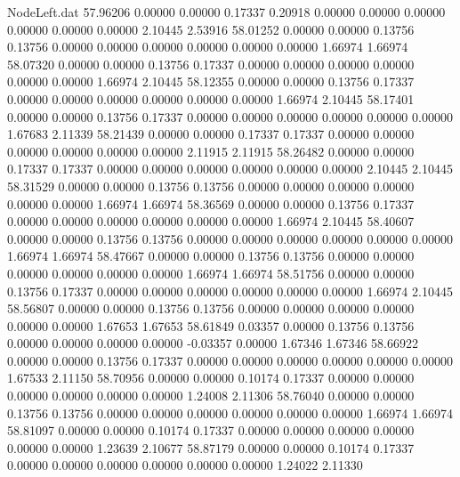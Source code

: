 \begin{filecontents}{NodeLeft.dat}
  57.96206    0.00000    0.00000     0.17337    0.20918    0.00000    0.00000    0.00000    0.00000    0.00000    0.00000    2.10445    2.53916
  58.01252    0.00000    0.00000     0.13756    0.13756    0.00000    0.00000    0.00000    0.00000    0.00000    0.00000    1.66974    1.66974
  58.07320    0.00000    0.00000     0.13756    0.17337    0.00000    0.00000    0.00000    0.00000    0.00000    0.00000    1.66974    2.10445
  58.12355    0.00000    0.00000     0.13756    0.17337    0.00000    0.00000    0.00000    0.00000    0.00000    0.00000    1.66974    2.10445
  58.17401    0.00000    0.00000     0.13756    0.17337    0.00000    0.00000    0.00000    0.00000    0.00000    0.00000    1.67683    2.11339
  58.21439    0.00000    0.00000     0.17337    0.17337    0.00000    0.00000    0.00000    0.00000    0.00000    0.00000    2.11915    2.11915
  58.26482    0.00000    0.00000     0.17337    0.17337    0.00000    0.00000    0.00000    0.00000    0.00000    0.00000    2.10445    2.10445
  58.31529    0.00000    0.00000     0.13756    0.13756    0.00000    0.00000    0.00000    0.00000    0.00000    0.00000    1.66974    1.66974
  58.36569    0.00000    0.00000     0.13756    0.17337    0.00000    0.00000    0.00000    0.00000    0.00000    0.00000    1.66974    2.10445
  58.40607    0.00000    0.00000     0.13756    0.13756    0.00000    0.00000    0.00000    0.00000    0.00000    0.00000    1.66974    1.66974
  58.47667    0.00000    0.00000     0.13756    0.13756    0.00000    0.00000    0.00000    0.00000    0.00000    0.00000    1.66974    1.66974
  58.51756    0.00000    0.00000     0.13756    0.17337    0.00000    0.00000    0.00000    0.00000    0.00000    0.00000    1.66974    2.10445
  58.56807    0.00000    0.00000     0.13756    0.13756    0.00000    0.00000    0.00000    0.00000    0.00000    0.00000    1.67653    1.67653
  58.61849    0.03357    0.00000     0.13756    0.13756    0.00000    0.00000    0.00000    0.00000   -0.03357    0.00000    1.67346    1.67346
  58.66922    0.00000    0.00000     0.13756    0.17337    0.00000    0.00000    0.00000    0.00000    0.00000    0.00000    1.67533    2.11150
  58.70956    0.00000    0.00000     0.10174    0.17337    0.00000    0.00000    0.00000    0.00000    0.00000    0.00000    1.24008    2.11306
  58.76040    0.00000    0.00000     0.13756    0.13756    0.00000    0.00000    0.00000    0.00000    0.00000    0.00000    1.66974    1.66974
  58.81097    0.00000    0.00000     0.10174    0.17337    0.00000    0.00000    0.00000    0.00000    0.00000    0.00000    1.23639    2.10677
  58.87179    0.00000    0.00000     0.10174    0.17337    0.00000    0.00000    0.00000    0.00000    0.00000    0.00000    1.24022    2.11330

\end{filecontents}
